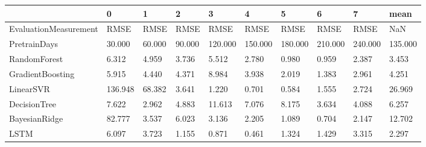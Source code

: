 \begin{tabular}{llllllllll}
\toprule
{} &       0 &      1 &      2 &       3 &       4 &       5 &       6 &       7 &    mean \\
\midrule
EvaluationMeasurement &    RMSE &   RMSE &   RMSE &    RMSE &    RMSE &    RMSE &    RMSE &    RMSE &     NaN \\
PretrainDays          &  30.000 & 60.000 & 90.000 & 120.000 & 150.000 & 180.000 & 210.000 & 240.000 & 135.000 \\
RandomForest          &   6.312 &  4.959 &  3.736 &   5.512 &   2.780 &   0.980 &   0.959 &   2.387 &   3.453 \\
GradientBoosting      &   5.915 &  4.440 &  4.371 &   8.984 &   3.938 &   2.019 &   1.383 &   2.961 &   4.251 \\
LinearSVR             & 136.948 & 68.382 &  3.641 &   1.220 &   0.701 &   0.584 &   1.555 &   2.724 &  26.969 \\
DecisionTree          &   7.622 &  2.962 &  4.883 &  11.613 &   7.076 &   8.175 &   3.634 &   4.088 &   6.257 \\
BayesianRidge         &  82.777 &  3.537 &  6.023 &   3.136 &   2.205 &   1.089 &   0.704 &   2.147 &  12.702 \\
LSTM                  &   6.097 &  3.723 &  1.155 &   0.871 &   0.461 &   1.324 &   1.429 &   3.315 &   2.297 \\
\bottomrule
\end{tabular}
